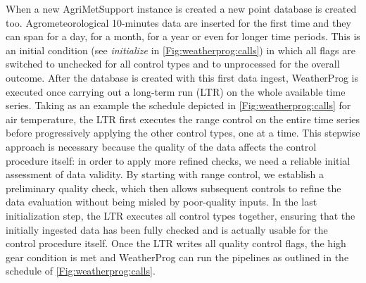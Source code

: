\documentclass[authoryear,preprint,review,12pt]{elsarticle}
\begin{document}
When a new Agri\-Met\-Support instance is created a new point database is created too.
Agrometeorological 10-minutes data are inserted for the first time and they can span for a day, for a month, for a year or even for longer time periods.
This is an initial condition (see \textit{initialize} in \cref{Fig:weatherprog:calls}) in which all flags are switched to unchecked for all control types and to unprocessed for the overall outcome.
After the database is created with this first data ingest, WeatherProg is executed once carrying out a long-term run (LTR) on the whole available time series.
Taking as an example the schedule depicted in \cref{Fig:weatherprog:calls} for air temperature, the LTR first executes the range control on the entire time series before progressively applying the other control types, one at a time. 
This stepwise approach is necessary because the quality of the data affects the control procedure itself: in order to apply more refined checks, we need a reliable initial assessment of data validity.
By starting with range control, we establish a preliminary quality check, which then allows subsequent controls to refine the data evaluation without being misled by poor-quality inputs.
In the last initialization step, the LTR executes all control types together, ensuring that the initially ingested data has been fully checked and is actually usable for the control procedure itself.
Once the LTR writes all quality control flags, the high gear condition is met and WeatherProg can run the pipelines as outlined in the schedule of \cref{Fig:weatherprog:calls}.
\end{document}
